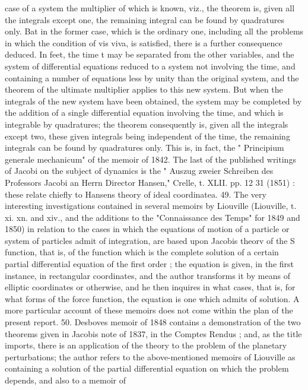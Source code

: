 \documentclass[11pt,a4paper]{book}
\begin{document}

case of a system the multiplier of which is known, viz., the theorem is, given all the
integrals except one, the remaining integral can be found by quadratures only. Bat
in the former case, which is the ordinary one, including all the problems in which the
condition of vis viva, is satisfied, there is a further consequence deduced. In feet, the
time t may be separated from the other variables, and the system of differential
equations reduced to a system not involving the time, and containing a number of
equations less by unity than the original system, and the theorem of the ultimate
multiplier applies to this new system. But when the integrals of the new system
have been obtained, the system may be completed by the addition of a single
differential equation involving the time, and which is integrable by quadratures; the
theorem consequently is, given all the integrals except two, these given integrals being
independent of the time, the remaining integrals can be found by quadratures only.
This is, in fact, the " Principium generale mechanicum" of the memoir of 1842.
The last of the published writings of Jacobi on the subject of dynamics is the
" Auszug zweier Schreiben des Professors Jacobi an Herrn Director Hansen," Crelle,
t. XLII. pp. 12 31 (1851) : these relate chiefly to Hansens theory of ideal coordinatea.
49. The very interesting investigations contained in several memoirs by Liouville
(Liouville, t. xi. xn. and xiv., and the additions to the "Connaissance des Temps" for
1849 and 1850) in relation to the cases in which the equations of motion of a
particle or system of particles admit of integration, are based upon Jacobis theorv of
the S function, that is, of the function which is the complete solution of a certain
partial differential equation of the first order ; the equation is given, in the first
instance, in rectangular coordinates, and the author transforms it by means of elliptic
coordinates or otherwise, and he then inquires in what cases, that is, for what forms
of the force function, the equation is one which admits of solution. A more particular
account of these memoirs does not come within the plan of the present report.
50. Desboves memoir of 1848 contains a demonstration of the two theorems
given
in Jacobis note of 1837, in the Comptes Rendus ; and, as the title imports, there is
an application of the theory to the problem of the planetary perturbations; the author
refers to the above-mentioned memoirs of Liouville as containing a solution of the
partial differential equation on which the problem depends, and also to a memoir of
\end{document}
